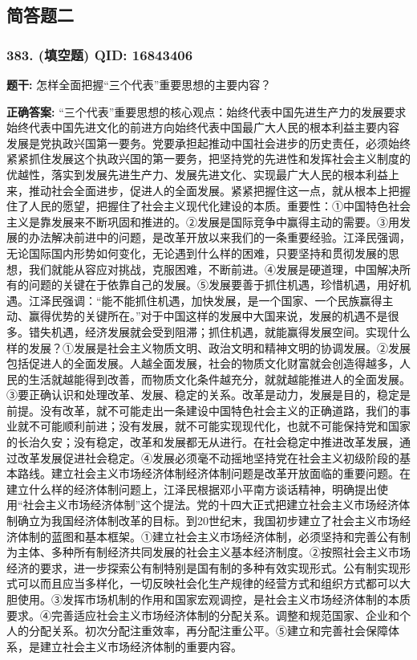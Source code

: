 \documentclass[12pt,UTF8]{ctexart}
\begin{document}
\vspace{0.3em}\hrulefill\vspace{0.7em}

\subsection*{简答题二}

\subsubsection*{383. (填空题) \small QID: 16843406}

\textbf{题干:}
怎样全面把握“三个代表”重要思想的主要内容？

\textbf{正确答案:}
“三个代表”重要思想的核心观点：始终代表中国先进生产力的发展要求
始终代表中国先进文化的前进方向始终代表中国最广大人民的根本利益主要内容
发展是党执政兴国第一要务。党要承担起推动中国社会进步的历史责任，必须始终紧紧抓住发展这个执政兴国的第一要务，把坚持党的先进性和发挥社会主义制度的优越性，落实到发展先进生产力、发展先进文化、实现最广大人民的根本利益上来，推动社会全面进步，促进人的全面发展。紧紧把握住这一点，就从根本上把握住了人民的愿望，把握住了社会主义现代化建设的本质。重要性：①中国特色社会主义是靠发展来不断巩固和推进的。②发展是国际竞争中赢得主动的需要。③用发展的办法解决前进中的问题，是改革开放以来我们的一条重要经验。江泽民强调，无论国际国内形势如何变化，无论遇到什么样的困难，只要坚持和贯彻发展的思想，我们就能从容应对挑战，克服困难，不断前进。④发展是硬道理，中国解决所有的问题的关键在于依靠自己的发展。⑤发展要善于抓住机遇，珍惜机遇，用好机遇。江泽民强调：“能不能抓住机遇，加快发展，是一个国家、一个民族赢得主动、赢得优势的关键所在。”对于中国这样的发展中大国来说，发展的机遇不是很多。错失机遇，经济发展就会受到阻滞；抓住机遇，就能赢得发展空间。实现什么样的发展？①发展是社会主义物质文明、政治文明和精神文明的协调发展。②发展包括促进人的全面发展。人越全面发展，社会的物质文化财富就会创造得越多，人民的生活就越能得到改善，而物质文化条件越充分，就就越能推进人的全面发展。③要正确认识和处理改革、发展、稳定的关系。改革是动力，发展是目的，稳定是前提。没有改革，就不可能走出一条建设中国特色社会主义的正确道路，我们的事业就不可能顺利前进；没有发展，就不可能实现现代化，也就不可能保持党和国家的长治久安；没有稳定，改革和发展都无从进行。在社会稳定中推进改革发展，通过改革发展促进社会稳定。④发展必须毫不动摇地坚持党在社会主义初级阶段的基本路线。建立社会主义市场经济体制经济体制问题是改革开放面临的重要问题。在建立什么样的经济体制问题上，江泽民根据邓小平南方谈话精神，明确提出使用“社会主义市场经济体制”这个提法。党的十四大正式把建立社会主义市场经济体制确立为我国经济体制改革的目标。到20世纪末，我国初步建立了社会主义市场经济体制的蓝图和基本框架。①建立社会主义市场经济体制，必须坚持和完善公有制为主体、多种所有制经济共同发展的社会主义基本经济制度。②按照社会主义市场经济的要求，进一步探索公有制特别是国有制的多种有效实现形式。公有制实现形式可以而且应当多样化，一切反映社会化生产规律的经营方式和组织方式都可以大胆使用。③发挥市场机制的作用和国家宏观调控，是社会主义市场经济体制的本质要求。④完善适应社会主义市场经济体制的分配关系。调整和规范国家、企业和个人的分配关系。初次分配注重效率，再分配注重公平。⑤建立和完善社会保障体系，是建立社会主义市场经济体制的重要内容。
\end{document}

